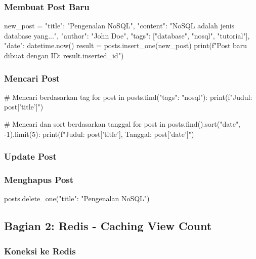 \subsubsection{Membuat Post Baru}

\begin{codebox}
new_post = {
    "title": "Pengenalan NoSQL",
    "content": "NoSQL adalah jenis database yang...",
    "author": "John Doe",
    "tags": ["database", "nosql", "tutorial"],
    "date": datetime.now()
}
result = posts.insert_one(new_post)
print(f"Post baru dibuat dengan ID: {result.inserted_id}")
\end{codebox}

\subsubsection{Mencari Post}

\begin{codebox}
# Mencari berdasarkan tag
for post in posts.find({"tags": "nosql"}):
    print(f"Judul: {post['title']}")

# Mencari dan sort berdasarkan tanggal
for post in posts.find().sort("date", -1).limit(5):
    print(f"Judul: {post['title']}, Tanggal: {post['date']}")
\end{codebox}

\subsubsection{Update Post}


\subsubsection{Menghapus Post}

\begin{codebox}
posts.delete_one({"title": "Pengenalan NoSQL"})
\end{codebox}

\subsection{Bagian 2: Redis - Caching View Count}

\subsubsection{Koneksi ke Redis}

